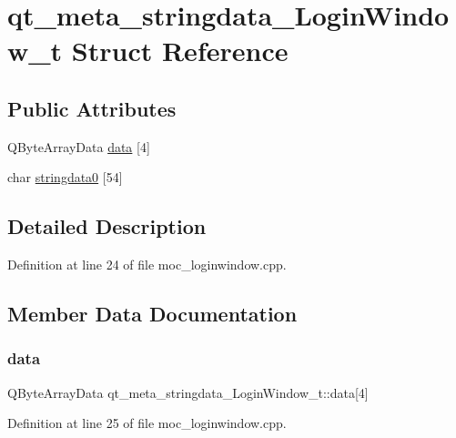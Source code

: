 \hypertarget{structqt__meta__stringdata___login_window__t}{}\section{qt\+\_\+meta\+\_\+stringdata\+\_\+\+Login\+Window\+\_\+t Struct Reference}
\label{structqt__meta__stringdata___login_window__t}
\subsection*{Public Attributes}
\begin{DoxyCompactItemize}
\item 
Q\+Byte\+Array\+Data \mbox{\hyperlink{structqt__meta__stringdata___login_window__t_a3e87705739ea15a192a2dd480157941e}{data}} \mbox{[}4\mbox{]}
\item 
char \mbox{\hyperlink{structqt__meta__stringdata___login_window__t_a36283c71f4a6fe995ac444fcdbb22ddb}{stringdata0}} \mbox{[}54\mbox{]}
\end{DoxyCompactItemize}


\subsection{Detailed Description}


Definition at line 24 of file moc\+\_\+loginwindow.\+cpp.



\subsection{Member Data Documentation}
\mbox{\label{structqt__meta__stringdata___login_window__t_a3e87705739ea15a192a2dd480157941e}} 
\subsubsection{\texorpdfstring{data}{data}}
{\footnotesize\ttfamily Q\+Byte\+Array\+Data qt\+\_\+meta\+\_\+stringdata\+\_\+\+Login\+Window\+\_\+t\+::data\mbox{[}4\mbox{]}}



Definition at line 25 of file moc\+\_\+loginwindow.\+cpp.

